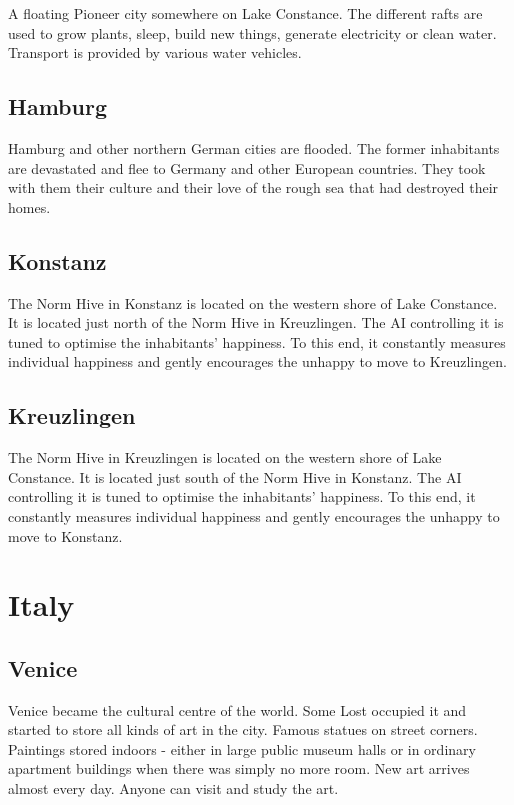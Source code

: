 A floating Pioneer city somewhere on Lake Constance. The different rafts are used to grow plants, sleep, build new things, generate electricity or clean water. Transport is provided by various water vehicles.

\subsection{Hamburg}
\label{subsec:Hamburg}

Hamburg and other northern German cities are flooded. The former inhabitants are devastated and flee to Germany and other European countries. They took with them their culture and their love of the rough sea that had destroyed their homes.

\subsection{Konstanz}
\label{subsec:Konstanz}

The Norm Hive in Konstanz is located on the western shore of Lake Constance. It is located just north of the Norm Hive in Kreuzlingen. The AI controlling it is tuned to optimise the inhabitants' happiness. To this end, it constantly measures individual happiness and gently encourages the unhappy to move to Kreuzlingen.

\subsection{Kreuzlingen}
\label{subsec:Kreuzlingen}

The Norm Hive in Kreuzlingen is located on the western shore of Lake Constance. It is located just south of the Norm Hive in Konstanz. The AI controlling it is tuned to optimise the inhabitants' happiness. To this end, it constantly measures individual happiness and gently encourages the unhappy to move to Konstanz.


\section{Italy}

\subsection{Venice}

Venice became the cultural centre of the world. Some Lost occupied it and started to store all kinds of art in the city. Famous statues on street corners. Paintings stored indoors - either in large public museum halls or in ordinary apartment buildings when there was simply no more room. New art arrives almost every day.
Anyone can visit and study the art.

